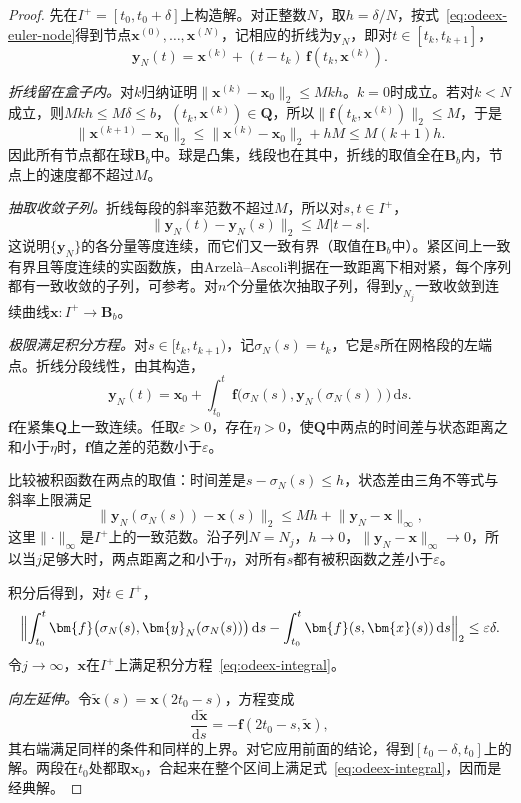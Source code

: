 \begin{proof}
先在$I^+=[t_0,t_0+\delta]$上构造解。对正整数$N$，取$h=\delta/N$，按式~\eqref{eq:odeex-euler-node}得到节点$\bm{x}^{(0)},\ldots,\bm{x}^{(N)}$，记相应的折线为$\bm{y}_N$，即对$t\in[t_k,t_{k+1}]$，
\[
 \bm{y}_N(t)=\bm{x}^{(k)}+(t-t_k)\,\bm{f}(t_k,\bm{x}^{(k)}).
\]

\emph{折线留在盒子内。}对$k$归纳证明$\lVert\bm{x}^{(k)}-\bm{x}_0\rVert_2\leq Mkh$。$k=0$时成立。若对$k<N$成立，则$Mkh\leq M\delta\leq b$，$(t_k,\bm{x}^{(k)})\in\bm{Q}$，所以$\lVert\bm{f}(t_k,\bm{x}^{(k)})\rVert_2\leq M$，于是
\[
 \lVert\bm{x}^{(k+1)}-\bm{x}_0\rVert_2\leq\lVert\bm{x}^{(k)}-\bm{x}_0\rVert_2+hM\leq M(k+1)h.
\]
因此所有节点都在球$\bm{B}_b$中。球是凸集，线段也在其中，折线的取值全在$\bm{B}_b$内，节点上的速度都不超过$M$。

\emph{抽取收敛子列。}折线每段的斜率范数不超过$M$，所以对$s,t\in I^+$，
\[
 \lVert\bm{y}_N(t)-\bm{y}_N(s)\rVert_2\leq M\lvert t-s\rvert.
\]
这说明$\{\bm{y}_N\}$的各分量等度连续，而它们又一致有界（取值在$\bm{B}_b$中）。紧区间上一致有界且等度连续的实函数族，由Arzelà--Ascoli判据在一致距离下相对紧，每个序列都有一致收敛的子列，可参考。对$n$个分量依次抽取子列，得到$\bm{y}_{N_j}$一致收敛到连续曲线$\bm{x}:I^+\to\bm{B}_b$。

\emph{极限满足积分方程。}对$s\in[t_k,t_{k+1})$，记$\sigma_N(s)=t_k$，它是$s$所在网格段的左端点。折线分段线性，由其构造，
\[
 \bm{y}_N(t)=\bm{x}_0+\int_{t_0}^{t}\bm{f}\bigl(\sigma_N(s),\bm{y}_N(\sigma_N(s))\bigr)\,\mathrm{d}s.
\]
$\bm{f}$在紧集$\bm{Q}$上一致连续。任取$\varepsilon>0$，存在$\eta>0$，使$\bm{Q}$中两点的时间差与状态距离之和小于$\eta$时，$\bm{f}$值之差的范数小于$\varepsilon$。

比较被积函数在两点的取值：时间差是$s-\sigma_N(s)\leq h$，状态差由三角不等式与斜率上限满足
\[
 \lVert\bm{y}_N(\sigma_N(s))-\bm{x}(s)\rVert_2\leq Mh+\lVert\bm{y}_N-\bm{x}\rVert_{\infty},
\]
这里$\lVert\cdot\rVert_{\infty}$是$I^+$上的一致范数。沿子列$N=N_j$，$h\to0$，$\lVert\bm{y}_N-\bm{x}\rVert_{\infty}\to0$，所以当$j$足够大时，两点距离之和小于$\eta$，对所有$s$都有被积函数之差小于$\varepsilon$。

积分后得到，对$t\in I^+$，
\[
 \Bigl\lVert\int_{t_0}^{t}\bm{f}\bigl(\sigma_N(s),\bm{y}_N(\sigma_N(s))\bigr)\,\mathrm{d}s
 -\int_{t_0}^{t}\bm{f}(s,\bm{x}(s))\,\mathrm{d}s\Bigr\rVert_2\leq\varepsilon\delta.
\]
令$j\to\infty$，$\bm{x}$在$I^+$上满足积分方程~\eqref{eq:odeex-integral}。

\emph{向左延伸。}令$\tilde{\bm{x}}(s)=\bm{x}(2t_0-s)$，方程变成
\[
 \frac{\mathrm{d}\tilde{\bm{x}}}{\mathrm{d}s}=-\bm{f}(2t_0-s,\tilde{\bm{x}}),
\]
其右端满足同样的条件和同样的上界。对它应用前面的结论，得到$[t_0-\delta,t_0]$上的解。两段在$t_0$处都取$\bm{x}_0$，合起来在整个区间上满足式~\eqref{eq:odeex-integral}，因而是经典解。
\end{proof}

